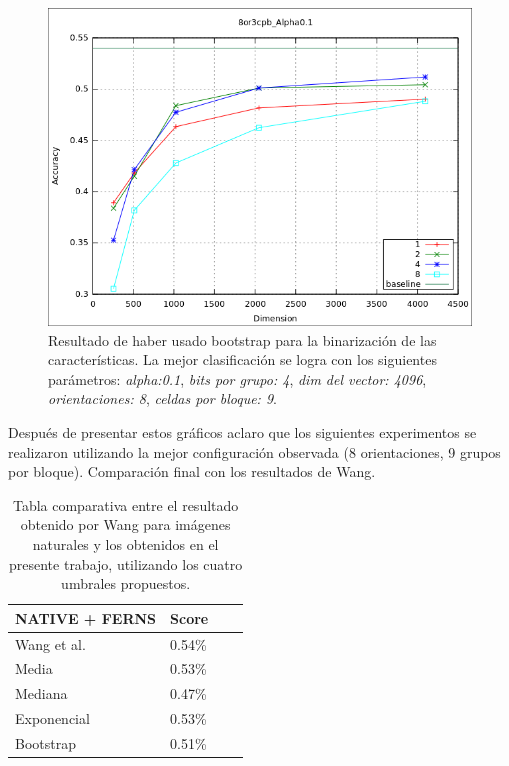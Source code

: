 			\begin{figure}[htbp]
				\centering
				\includegraphics[scale=0.6]{img/resultados/reales/bootstrap_8or3cpb_Alpha0,1.png}
				\caption[Reales con umbral boostrap]{Resultado de haber usado bootstrap para la binarización de las características. La mejor clasificación se logra con los siguientes parámetros: \textit{alpha:0.1}, \textit{bits por grupo: 4}, \textit{dim del vector: 4096}, \textit{orientaciones: 8}, \textit{celdas por bloque: 9}.}
				\label{fig: Reales-bootstrap-8or9cpbAlph0.1}
			\end{figure}
			
			
		Después de presentar estos gráficos aclaro que los siguientes experimentos se realizaron utilizando la mejor configuración observada (8 orientaciones, 9 grupos por bloque). Comparación final con los resultados de Wang.
	\begin{table}
		\centering
		\begin{tabular}{ | l | l | l | p{5cm} |}
    			\hline
    				\textbf{NATIVE + FERNS} & \textbf{Score} \\ \hline
    				Wang et al. & 0.54\% \\ \hline
    				Media & 0.53\% \\ \hline
    				Mediana & 0.47\%\\ \hline
    				Exponencial & 0.53\% \\ \hline
    				Bootstrap & 0.51\%\\ 
    			\hline
    		\end{tabular}
    		\caption{Tabla comparativa entre el resultado obtenido por Wang para imágenes naturales y los obtenidos en el presente trabajo, utilizando los cuatro umbrales propuestos.}
    	\end{table}
    	
